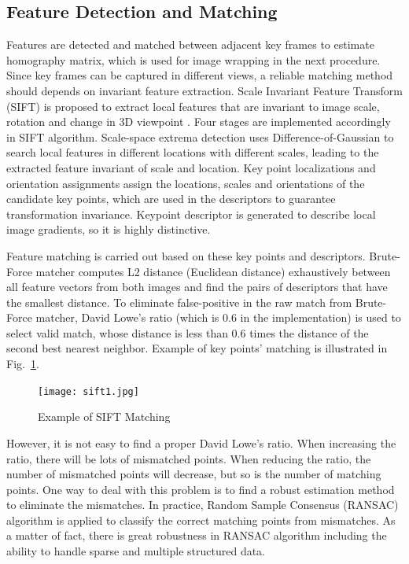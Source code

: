 \documentclass[runningheads]{llncs}
\begin{document}
\subsection{Feature Detection and Matching}

Features are detected and matched between adjacent key frames to estimate homography matrix, which is used for image wrapping in the next procedure. Since key frames can be captured in different views, a reliable matching method should depends on invariant feature extraction. Scale Invariant Feature Transform (SIFT) is proposed to extract local features that are invariant to image scale, rotation and change in 3D viewpoint \cite{lowe2004distinctive}. Four stages are implemented accordingly in SIFT algorithm. Scale-space extrema detection uses Difference-of-Gaussian to search local features in different locations with different scales, leading to the extracted feature invariant of scale and location. Key point localizations and orientation assignments assign the locations, scales and orientations of the candidate key points, which are used in the descriptors to guarantee transformation invariance. Keypoint descriptor is generated to describe local image gradients, so it is highly distinctive.

Feature matching is carried out based on these key points and descriptors. Brute-Force matcher computes L2 distance (Euclidean distance) exhaustively between all feature vectors from both images and find the pairs of descriptors that have the smallest distance. To eliminate false-positive in the raw match from Brute-Force matcher, David Lowe's ratio (which is 0.6 in the implementation) is used to select valid match, whose distance is less than 0.6 times the distance of the second best nearest neighbor. Example of key points' matching is illustrated in Fig.~\ref{fig:sift1}.

\begin{figure}[h!]
  \centering
  \texttt{[image: sift1.jpg]}
  \caption{Example of SIFT Matching}
  \label{fig:sift1}
\end{figure}

However, it is not easy to find a proper David Lowe's ratio. When increasing the ratio, there will be lots of mismatched points. When reducing the ratio, the number of mismatched points will decrease, but so is the number of matching points. One way to deal with this problem is to find a robust estimation method to eliminate the mismatches. In practice, Random Sample Consensus (RANSAC) algorithm is applied to classify the correct matching points from mismatches. As a matter of fact, there is great robustness in RANSAC algorithm including the ability to handle sparse and multiple structured data.
\end{document}
